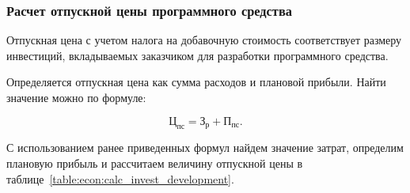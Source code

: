 
\subsubsection{Расчет отпускной цены программного средства}

Отпускная цена с учетом налога на добавочную стоимость соответствует размеру
инвестиций, вкладываемых заказчиком для разработки программного средства.

Определяется отпускная цена как сумма расходов и плановой прибыли.
Найти значение можно по формуле:

\begin{equation}
  \label{eq:econ:TsPs}
  \text{Ц}_\text{пс} = \text{З}_\text{р} + \text{П}_\text{пс}.
\end{equation}


С использованием ранее приведенных формул найдем значение затрат, определим
плановую прибыль и рассчитаем величину отпускной цены
в таблице~\ref{table:econ:calc_invest_development}.

